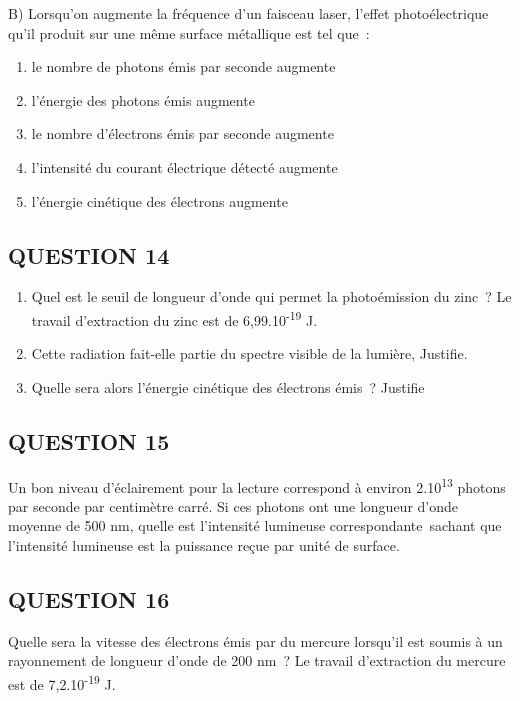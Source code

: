 {{{B) Lorsqu'on augmente la fréquence d'un faisceau laser, l'effet
photoélectrique qu'il produit sur une même surface métallique est tel
que~:
\begin{enumerate}
  \item    le nombre de photons émis par seconde augmente
  \item    l'énergie des photons émis augmente
  \item  le nombre d'électrons émis par seconde augmente
  \item    l'intensité du courant électrique détecté augmente
  \item    l'énergie cinétique des électrons augmente
\end{enumerate}

\subsection{QUESTION 14}

\begin{enumerate}
\item  Quel est le seuil de longueur d'onde qui permet la photoémission du
  zinc~? Le travail d'extraction du zinc est de
  6,99.10\textsuperscript{-19} J.
\item  Cette radiation fait-elle partie du spectre visible de la lumière,
  Justifie.
\item  Quelle sera alors l'énergie cinétique des électrons émis~? Justifie
\end{enumerate}

\subsection{QUESTION 15}

Un bon niveau d'éclairement pour la lecture correspond à environ
2.10\textsuperscript{13} photons par seconde par centimètre carré. Si
ces photons ont une longueur d'onde moyenne de 500 nm, quelle est
l'intensité lumineuse correspondante~sachant que l'intensité lumineuse
est la puissance reçue par unité de surface.

\subsection{QUESTION 16}

Quelle sera la vitesse des électrons émis par du mercure lorsqu'il est
soumis à un rayonnement de longueur d'onde de 200 nm~? Le travail
d'extraction du mercure est de 7,2.10\textsuperscript{-19} J.

}}}
